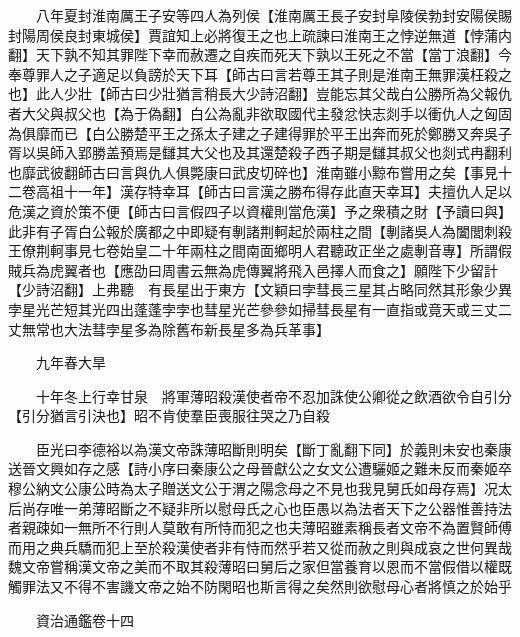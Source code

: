 　　八年夏封淮南厲王子安等四人為列侯【淮南厲王長子安封阜陵侯勃封安陽侯賜封陽周侯良封東城侯】賈誼知上必將復王之也上疏諫曰淮南王之悖逆無道【悖蒲内翻】天下孰不知其罪陛下幸而赦遷之自疾而死天下孰以王死之不當【當丁浪翻】今奉尊罪人之子適足以負謗於天下耳【師古曰言若尊王其子則是淮南王無罪漢枉殺之也】此人少壯【師古曰少壯猶言稍長大少詩沼翻】豈能忘其父哉白公勝所為父報仇者大父與叔父也【為于偽翻】白公為亂非欲取國代主發忿快志剡手以衝仇人之匈固為俱靡而已【白公勝楚平王之孫太子建之子建得罪於平王出奔而死於鄭勝又奔吳子胥以吳師入郢勝盖預焉是讎其大父也及其還楚殺子西子期是讎其叔父也剡式冉翻利也靡武彼翻師古曰言與仇人俱斃康曰武皮切碎也】淮南雖小黥布嘗用之矣【事見十二卷高祖十一年】漢存特幸耳【師古曰言漢之勝布得存此直天幸耳】夫擅仇人足以危漢之資於策不便【師古曰言假四子以資權則當危漢】予之衆積之財【予讀曰與】此非有子胥白公報於廣都之中即疑有剸諸荆軻起於兩柱之間【剸諸吳人為闔閭刺殺王僚荆軻事見七卷始皇二十年兩柱之間南面鄉明人君聽政正坐之處剸音專】所謂假賊兵為虎翼者也【應劭曰周書云無為虎傳翼將飛入邑擇人而食之】願陛下少留計【少詩沼翻】上弗聽　有長星出于東方【文穎曰孛彗長三星其占略同然其形象少異孛星光芒短其光四出蓬蓬孛孛也彗星光芒參參如掃彗長星有一直指或竟天或三丈二丈無常也大法彗孛星多為除舊布新長星多為兵革事】

　　九年春大旱

　　十年冬上行幸甘泉　將軍薄昭殺漢使者帝不忍加誅使公卿從之飲酒欲令自引分【引分猶言引決也】昭不肯使羣臣喪服往哭之乃自殺

　　臣光曰李德裕以為漢文帝誅薄昭斷則明矣【斷丁亂翻下同】於義則未安也秦康送晉文興如存之感【詩小序曰秦康公之母晉獻公之女文公遭驪姬之難未反而秦姬卒穆公納文公康公時為太子贈送文公于渭之陽念母之不見也我見舅氏如母存焉】况太后尚存唯一弟薄昭斷之不疑非所以慰母氏之心也臣愚以為法者天下之公器惟善持法者親疎如一無所不行則人莫敢有所恃而犯之也夫薄昭雖素稱長者文帝不為置賢師傅而用之典兵驕而犯上至於殺漢使者非有恃而然乎若又從而赦之則與成哀之世何異哉魏文帝嘗稱漢文帝之美而不取其殺薄昭曰舅后之家但當養育以恩而不當假借以權既觸罪法又不得不害譏文帝之始不防閑昭也斯言得之矣然則欲慰母心者將慎之於始乎

　　資治通鑑卷十四  
    


 


 



 

 
  







 



